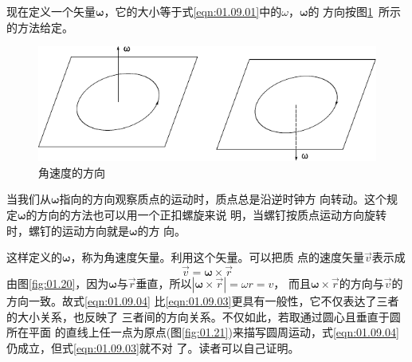 现在定义一个矢量$\boldsymbol{\omega}$，它的大小等于式\eqref{eqn:01.09.01}中的$\omega$，$\boldsymbol{\omega}$的
方向按图\ref{fig:01.19}~所示的方法给定。
\begin{figure}[!h]
    \includegraphics{figure/fig01.19}
    \caption{角速度的方向}
    \label{fig:01.19}
    \vspace{-1.2em}
\end{figure}

\noindent 当我们从$\boldsymbol{\omega}$指向的方向观察质点的运动时，质点总是沿逆时钟方
向转动。这个规定$\boldsymbol{\omega}$的方向的方法也可以用一个正扣螺旋来说
明，当螺钉按质点运动方向旋转时，螺钉的运动方向就是$\boldsymbol{\omega}$的方
向。

这样定义的$\boldsymbol{\omega}$，称为角速度矢量。利用这个矢量。可以把质
点的速度矢量$\vec{v}$表示成
\begin{equation}\label{eqn:01.09.04}
    \vec{v}=\boldsymbol{\omega}\times \vec{r}
\end{equation}
由图\ref{fig:01.20}，因为$\boldsymbol{\omega}$与$\vec{r}$垂直，所以$|\boldsymbol{\omega}\times\vec{r}|=\omega r=v$，
而且$\boldsymbol{\omega}\times\vec{r}$的方向与$\vec{v}$的方向一致。故式\eqref{eqn:01.09.04}
比\eqref{eqn:01.09.03}更具有一般性，它不仅表达了三者的大小关系，也反映了
三者间的方向关系。不仅如此，若取通过圆心且垂直于圆所在平面
的直线上任一点为原点(图\ref{fig:01.21})来描写圆周运动，式\eqref{eqn:01.09.04}仍成立，但式\eqref{eqn:01.09.03}就不对
\clearpage
\noindent 了。读者可以自己证明。

